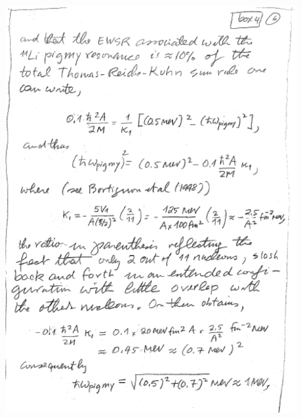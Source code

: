 \documentclass[a4paper,11pt]{book}
\numberwithin{equation}{section}
\numberwithin{figure}{section}
\numberwithin{table}{section}
\begin{document}
\begin{figure}
\centerline{\includegraphics*[width=\textwidth,angle=0]{figs/box4_8.pdf}}
\end{figure}
\end{document}
